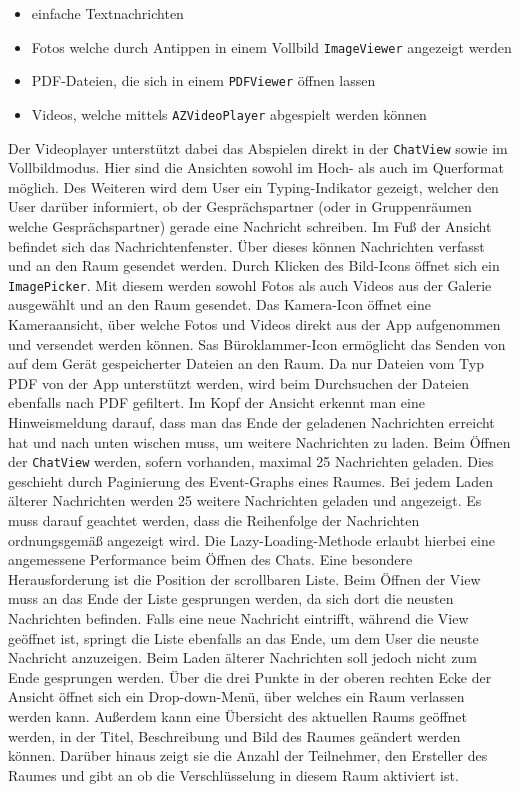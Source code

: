     \begin{itemize}
        \item einfache Textnachrichten
        \item Fotos welche durch Antippen in einem Vollbild \texttt{ImageViewer} angezeigt werden
        \item PDF-Dateien, die sich in einem \texttt{PDFViewer} öffnen lassen
        \item Videos, welche mittels \texttt{AZVideoPlayer} abgespielt werden können
    \end{itemize}
    Der Videoplayer unterstützt dabei das Abspielen direkt in der \texttt{ChatView} sowie im Vollbildmodus.
    Hier sind die Ansichten sowohl im Hoch- als auch im Querformat möglich.
    Des Weiteren wird dem User ein Typing-Indikator gezeigt, welcher den User darüber informiert, ob der Gesprächspartner (oder in Gruppenräumen welche Gesprächspartner) gerade eine Nachricht schreiben.
    Im Fuß der Ansicht befindet sich das Nachrichtenfenster.
    Über dieses können Nachrichten verfasst und an den Raum gesendet werden.
    Durch Klicken des Bild-Icons öffnet sich ein \texttt{ImagePicker}.
    Mit diesem werden sowohl Fotos als auch Videos aus der Galerie ausgewählt und an den Raum gesendet.
    Das Kamera-Icon öffnet eine Kameraansicht, über welche Fotos und Videos direkt aus der App aufgenommen und versendet werden können.
    Sas Büroklammer-Icon ermöglicht das Senden von auf dem Gerät gespeicherter Dateien an den Raum.
    Da nur Dateien vom Typ PDF von der App unterstützt werden, wird beim Durchsuchen der Dateien ebenfalls nach PDF gefiltert.
    Im Kopf der Ansicht erkennt man eine Hinweismeldung darauf, dass man das Ende der geladenen Nachrichten erreicht hat und nach unten wischen muss, um weitere Nachrichten zu laden.
    Beim Öffnen der \texttt{ChatView} werden, sofern vorhanden, maximal 25 Nachrichten geladen.
    Dies geschieht durch Paginierung des Event-Graphs eines Raumes.
    Bei jedem Laden älterer Nachrichten werden 25 weitere Nachrichten geladen und angezeigt.
    Es muss darauf geachtet werden, dass die Reihenfolge der Nachrichten ordnungsgemäß angezeigt wird.
    Die Lazy-Loading-Methode erlaubt hierbei eine angemessene Performance beim Öffnen des Chats.
    Eine besondere Herausforderung ist die Position der scrollbaren Liste.
    Beim Öffnen der View muss an das Ende der Liste gesprungen werden, da sich dort die neusten Nachrichten befinden.
    Falls eine neue Nachricht eintrifft, während die View geöffnet ist, springt die Liste ebenfalls an das Ende, um dem User die neuste Nachricht anzuzeigen.
    Beim Laden älterer Nachrichten soll jedoch nicht zum Ende gesprungen werden.
    Über die drei Punkte in der oberen rechten Ecke der Ansicht öffnet sich ein Drop-down-Menü, über welches ein Raum verlassen werden kann.
    Außerdem kann eine Übersicht des aktuellen Raums geöffnet werden, in der Titel, Beschreibung und Bild des Raumes geändert werden können.
    Darüber hinaus zeigt sie die Anzahl der Teilnehmer, den Ersteller des Raumes und gibt an ob die Verschlüsselung in diesem Raum aktiviert ist.

